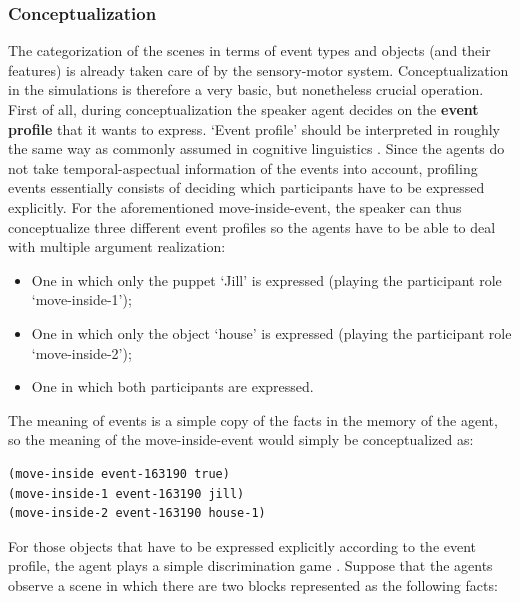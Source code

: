 \subsubsection{Conceptualization}
 The categorization of the scenes in terms of event types and objects (and their features) is already taken care of by the sensory-motor system. Conceptualization in the simulations is therefore a very basic, but nonetheless crucial operation. First of all, during conceptualization the speaker agent decides on the {\bfseries event profile} that it wants to express. `Event profile' should be interpreted in roughly the same way as commonly assumed in cognitive linguistics \citep[see for instance][]{croft98event}. Since the agents do not take temporal-aspectual information of the events into account, profiling events essentially consists of deciding which participants have to be expressed explicitly. For the aforementioned move-inside-event, the speaker can thus conceptualize three different event profiles so the agents have to be able to deal with multiple argument realization:

\begin{itemize}
\item One in which only the puppet `Jill' is expressed (playing the participant role `move-inside-1');
\item One in which only the object `house' is expressed (playing the participant role `move-inside-2');
\item One in which both participants are expressed.
\end{itemize}

The meaning of events is a simple copy of the facts in the memory of the agent, so the meaning of the move-inside-event would simply be conceptualized as:

\ea
\label{facts2}
\begin{lstlisting}
(move-inside event-163190 true)
(move-inside-1 event-163190 jill)
(move-inside-2 event-163190 house-1)
\end{lstlisting}
\z

For those objects that have to be expressed explicitly according to the event profile, the agent plays a simple discrimination game \citep{steels96perceptually, steels97constructing}. Suppose that the agents observe a scene in which there are two blocks represented as the following facts:

